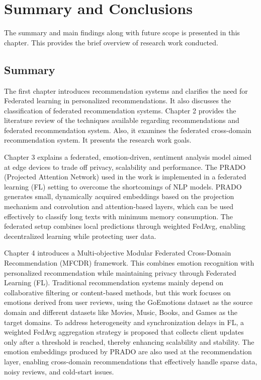 \chapter{Summary and Conclusions}
The summary and main findings along with future scope is presented in this chapter. This provides the brief overview of research work conducted.

\section{Summary}
The first chapter introduces recommendation systems and clarifies the need for Federated learning in personalized recommendations. It also discusses the classification of federated recommendation systems. Chapter 2 provides the literature review of the techniques available regarding recommendations and federated recommendation system. Also, it examines the federated cross-domain recommendation system. It presents the research work goals.

Chapter 3 explains a federated, emotion-driven, sentiment analysis model aimed at edge devices to trade off privacy, scalability and performance. The PRADO (Projected Attention Network) used in the work is implemented in a federated learning (FL) setting to overcome the shortcomings of NLP models. PRADO generates small, dynamically acquired embeddings based on the projection mechanism and convolution and attention-based layers, which can be used effectively to classify long texts with minimum memory consumption. The federated setup combines local predictions through weighted FedAvg, enabling decentralized learning while protecting user data.

Chapter 4 introduces a Multi-objective Modular Federated Cross-Domain Recommendation (MFCDR) framework.  This combines emotion recognition with personalized recommendation while maintaining privacy through Federated Learning (FL). Traditional recommendation systems mainly depend on collaborative filtering or content-based methods, but this work focuses on emotions derived from user reviews, using the GoEmotions dataset as the source domain and different datasets like Movies, Music, Books, and Games as the target domains. To address heterogeneity and synchronization delays in FL, a weighted FedAvg aggregation strategy is proposed that collects client updates only after a threshold is reached, thereby enhancing scalability and stability. The emotion embeddings produced by PRADO are also used at the recommendation layer, enabling cross-domain recommendations that effectively handle sparse data, noisy reviews, and cold-start issues.

